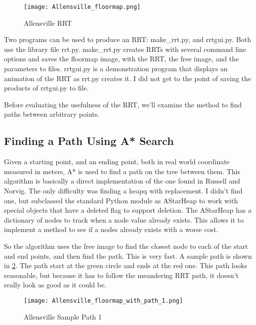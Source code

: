 \documentclass[10pt,twocolumn,letterpaper]{article}
\begin{document}
\begin{centering}
\begin{figure}[ht]
\caption{Allensville RRT} \centering
\texttt{[image: Allensville\_floormap.png]}
\label{fig:floormap}
\end{figure}
\end{centering}

Two programs can be used to produce an RRT: make\_rrt.py, and
rrtgui.py. Both use the library file rrt.py. make\_rrt.py creates RRTs
with several command line options and saves the floormap image, with
the RRT, the free image, and the parameters to files. rrtgui.py is a
demonstration program that displays an animation of the RRT as rrt.py
creates it. I did not get to the point of saving the products of
rrtgui.py to file.

Before evaluating the usefulness of the RRT, we'll examine the method
to find paths between arbitrary points.

\subsection{Finding a Path Using A* Search}

Given a starting point, and an ending point, both in real world
coordinate measured in meters, A* is used to find a path on the tree
between them. This algorithm is basically a direct implementation of
the one found in Russell and Norvig. The only difficulty was finding a
heapq with replacement. I didn't find one, but subclassed the standard
Python module as AStarHeap to work with special objects that have a
deleted flag to support deletion. The AStarHeap has a dictionary of
nodes to track when a node value already exists. This allows it to
implement a method to see if a nodes already exists with a worse cost.

So the algorithm uses the free image to find the closest node to each
of the start and end points, and then find the path. This is very
fast. A sample path is shown in \ref{fig:path_1}. The path start at
the green circle and ends at the red one. This path looks reasonable,
but because it has to follow the meandering RRT path, it doesn't
really look as good as it could be. 

\begin{centering}
\begin{figure}[ht]
\caption{Allensville Sample Path 1} \centering
\texttt{[image: Allensville\_floormap\_with\_path\_1.png]}
\label{fig:path_1}
\end{figure}
\end{centering}
\end{document}
